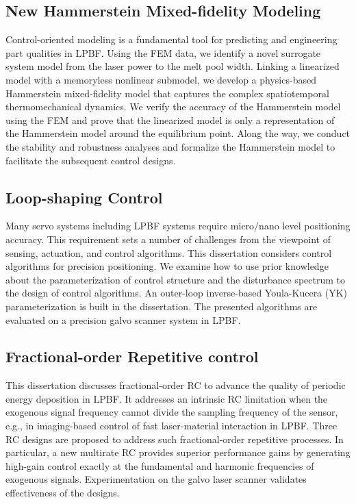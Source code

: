 \documentclass [11pt, proquest] {uwthesis}[2020/02/24]
\begin{document}
\subsection*{New Hammerstein Mixed-fidelity Modeling}
Control-oriented modeling is a fundamental tool
for predicting and engineering part qualities in LPBF. Using
the FEM data, we identify a novel surrogate system model from the
laser power to the melt pool width. Linking a linearized model with
a memoryless nonlinear submodel, we develop a physics-based Hammerstein
mixed-fidelity model that captures the complex spatiotemporal thermomechanical dynamics.
We verify the accuracy of the Hammerstein model using the FEM and
prove that the linearized model is only a representation of the Hammerstein
model around the equilibrium point. Along the way, we conduct the
stability and robustness analyses and formalize the Hammerstein model
to facilitate the subsequent control designs.

\subsection*{Loop-shaping Control}
Many servo systems including LPBF systems require micro/nano level positioning accuracy. This requirement sets a number of challenges from the viewpoint of sensing, actuation, and control algorithms. This dissertation considers control algorithms for precision positioning. We examine how to use prior knowledge about the parameterization of control structure and the disturbance spectrum to the design of control algorithms. An outer-loop inverse-based Youla-Kucera (YK) parameterization is built in the dissertation. The presented algorithms are evaluated on a precision galvo scanner system in LPBF.

\subsection*{Fractional-order Repetitive control}
This dissertation discusses fractional-order RC to advance
the quality of periodic energy deposition in LPBF. It addresses an intrinsic RC limitation when the
exogenous signal frequency cannot divide the sampling frequency of
the sensor, e.g., in imaging-based control of fast laser-material
interaction in LPBF. Three RC designs are proposed to address such fractional-order
repetitive processes. In particular, a new multirate RC provides superior
performance gains by generating high-gain control exactly at the fundamental
and harmonic frequencies of exogenous signals. Experimentation on
the galvo laser scanner validates effectiveness of the designs.
\end{document}
